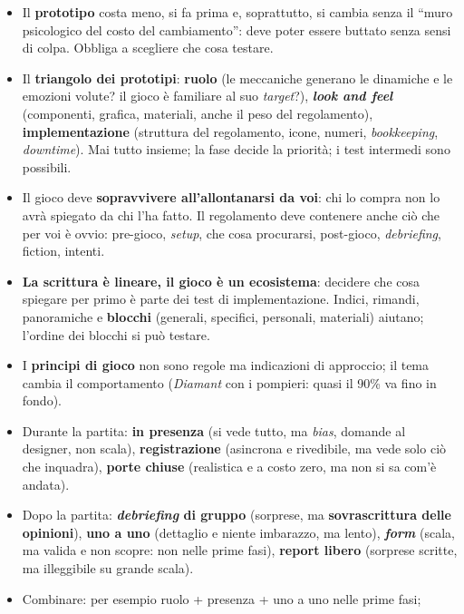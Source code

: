 \begin{itemize}
  \item Il \textbf{prototipo} costa meno, si fa prima e, soprattutto, si cambia senza
        il ``muro psicologico del costo del cambiamento'': deve poter essere buttato senza
        sensi di colpa. Obbliga a scegliere che cosa testare.
  \item Il \textbf{triangolo dei prototipi}: \textbf{ruolo} (le meccaniche generano le
        dinamiche e le emozioni volute? il gioco è familiare al suo \emph{target}?),
        \textbf{\emph{look and feel}} (componenti, grafica, materiali, anche il peso del
        regolamento), \textbf{implementazione} (struttura del regolamento, icone, numeri,
        \emph{bookkeeping}, \emph{downtime}). Mai tutto insieme; la fase decide la
        priorità; i test intermedi sono possibili.
  \item Il gioco deve \textbf{sopravvivere all'allontanarsi da voi}: chi lo compra non lo
        avrà spiegato da chi l'ha fatto. Il regolamento deve contenere anche ciò che per
        voi è ovvio: pre-gioco, \emph{setup}, che cosa procurarsi, post-gioco,
        \emph{debriefing}, fiction, intenti.
  \item \textbf{La scrittura è lineare, il gioco è un ecosistema}: decidere che cosa
        spiegare per primo è parte dei test di implementazione. Indici, rimandi,
        panoramiche e \textbf{blocchi} (generali, specifici, personali, materiali)
        aiutano; l'ordine dei blocchi si può testare.
  \item I \textbf{principi di gioco} non sono regole ma indicazioni di approccio; il tema
        cambia il comportamento (\emph{Diamant} con i pompieri: quasi il 90\% va fino in
        fondo).
  \item Durante la partita: \textbf{in presenza} (si vede tutto, ma \emph{bias},
        domande al designer, non scala), \textbf{registrazione} (asincrona e rivedibile,
        ma vede solo ciò che inquadra), \textbf{porte chiuse} (realistica e a costo zero,
        ma non si sa com'è andata).
  \item Dopo la partita: \textbf{\emph{debriefing} di gruppo} (sorprese, ma
        \textbf{sovrascrittura delle opinioni}), \textbf{uno a uno} (dettaglio e niente
        imbarazzo, ma lento), \textbf{\emph{form}} (scala, ma valida e non scopre: non
        nelle prime fasi), \textbf{report libero} (sorprese scritte, ma illeggibile su
        grande scala).
  \item Combinare: per esempio ruolo + presenza + uno a uno nelle prime fasi;

\end{itemize}
